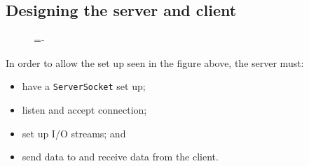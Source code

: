 \documentclass[a4paper]{systems-software}
\begin{document}
\newpage

\subsection*{Designing the server and client}

\begin{figure}[H]
	\lineskip=-\fboxrule
\end{figure}

In order to allow the set up seen in the figure above, the server must:
\begin{itemize}
	\item have a \texttt{ServerSocket} set up;
	\item listen and accept connection;
	\item set up I/O streams; and
	\item send data to and receive data from the client.
\end{itemize}
\end{document}
